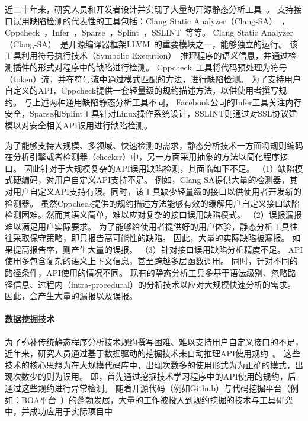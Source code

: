 近二十年来，研究人员和开发者设计并实现了大量的开源静态分析工具~\cite{wiki-static-tool}。
支持接口误用缺陷检测的代表性的工具包括：Clang Static Analyzer（Clang-SA）~\cite{clang-sa}， Cppcheck~\cite{cppcheck}，Infer~\cite{infer}，Sparse~\cite{sparse}，Splint~\cite{splint}，SSLINT~\cite{15-sp-sslint}等等。
Clang Static Analyzer（Clang-SA）~\cite{clang-sa}是开源编译器框架LLVM~\cite{llvm}的重要模块之一，能够独立的运行。
该工具利用符号执行技术（Symbolic Execution）~\cite{13-acm-se}推理程序的语义信息，并通过检测插件的形式对程序中的缺陷进行检测。
Cppcheck~\cite{cppcheck}工具将代码预处理为符号（token）流，并在符号流中通过模式匹配的方法，进行缺陷检测。
为了支持用户自定义的API，Cppcheck提供一套轻量级的规约描述方法，以供使用者撰写规约。
与上述两种通用缺陷静态分析工具不同，
Facebook公司的Infer工具关注内存安全，Sparse和Splint工具针对Linux操作系统设计，SSLINT则通过对SSL协议建模以对安全相关API误用进行缺陷检测。


为了能够支持大规模、多领域、快速检测的需求，静态分析技术一方面将规则编码在分析引擎或者检测器（checker）中，另一方面采用抽象的方法以简化程序接口。
因此针对于大规模复杂的API误用缺陷检测，其面临如下不足。
（1）缺陷模式硬编码，对用户自定义API支持不足。
例如，Clang-SA提供大量的检测器，其对用户自定义API支持有限。同时，该工具缺少轻量级的接口以供使用者开发新的检测器。
虽然Cppcheck提供的规约描述方法能够有效的缓解用户自定义接口缺陷检测困难。然而其语义简单，难以应对复杂的接口误用缺陷模式。
（2）误报漏报难以满足用户实际要求。
为了能够给使用者提供好的用户体验，静态分析工具往往采取保守策略，即只报告高可能性的缺陷。
因此，大量的实际缺陷被漏报。
如果提高报告率，则产生大量的误报。
（3）针对接口误用缺陷分析精度不足。
API使用多包含复杂的语义上下文信息，甚至跨越多层函数调用。
同时，针对不同的路径条件，API使用的情况不同。
现有的静态分析工具多基于语法级别、忽略路径信息、过程内（intra-procedural）的分析技术以应对大规模快速分析的需求。
因此，会产生大量的漏报以及误报。

\paragraph{数据挖掘技术}
为了弥补传统静态程序分析技术规约撰写困难、难以支持用户自定义接口的不足，近年来，研究人员通过基于数据驱动的挖掘技术来自动推理API使用规约~\cite{13survey}。
这些技术的核心思想为在大规模代码库中，出现次数多的使用形式为为正确的模式，出现次数少的则为误用。
即，首先通过挖掘技术学习程序中的API使用的规约，后通过这些规约进行异常检测。
随着开源代码（例如Github）与代码挖掘平台（例如：BOA平台~\cite{15-tosem-boa}）的蓬勃发展，大量的工作被投入到规约挖掘的技术与工具研究中，并成功应用于实际项目中~\cite{survey18}

